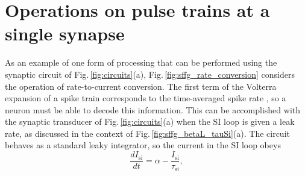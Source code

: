 \documentclass[twocolumn]{article}
\begin{document}
\section{\label{sec:short_term}Operations on pulse trains at a single synapse}
\begin{figure} 
\end{figure}
As an example of one form of processing that can be performed using the synaptic circuit of Fig.\,\ref{fig:circuits}(a), Fig.\,\ref{fig:sffg_rate_conversion} considers the operation of rate-to-current conversion. The first term of the Volterra expansion of a spike train corresponds to the time-averaged spike rate \cite{geki2002}, so a neuron must be able to decode this information. This can be accomplished with the synaptic transducer of Fig.\,\ref{fig:circuits}(a) when the SI loop is given a leak rate, as discussed in the context of Fig.\,\ref{fig:sffg_betaL_tauSi}(a). The circuit behaves as a standard leaky integrator, so the current in the SI loop obeys
\begin{equation}
\label{eq:leaky_integrator}
\frac{dI_{\mathrm{si}}}{dt} = \alpha-\frac{I_{\mathrm{si}}}{\tau_{\mathrm{si}}},
\end{equation}
\end{document}

